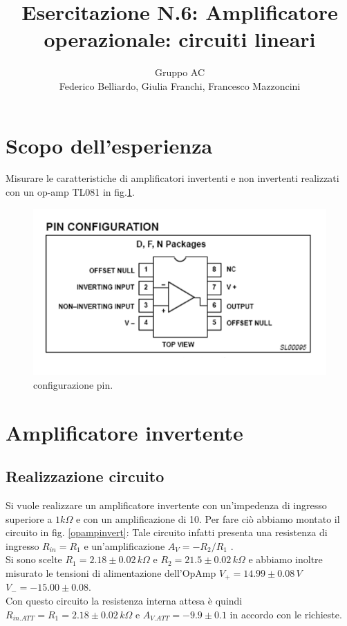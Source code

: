 \documentclass[10pt,a4paper]{article}
\author{Gruppo AC \\ Federico Belliardo, Giulia Franchi, Francesco Mazzoncini}
\title{Esercitazione N.6: Amplificatore operazionale: circuiti lineari}
\begin{document}
\maketitle
\section{Scopo dell'esperienza}

Misurare le caratteristiche di amplificatori invertenti e non invertenti realizzati con un op-amp TL081 in fig.\ref{pin}.
\begin{figure}[!htb]
  \centering
  \includegraphics[scale=0.5]{pinrelaz6.png}
\caption{configurazione pin.}
\label{pin}
\end{figure}

\section{Amplificatore invertente}
\subsection{Realizzazione circuito}
Si vuole realizzare un amplificatore invertente con un'impedenza di ingresso superiore a $1k\Omega$ e con un amplificazione di 10. 
Per fare ciò abbiamo montato il circuito in fig. \ref{opampinvert}: Tale circuito infatti presenta una  resistenza di ingresso $R_{in}=R_1$ e un'amplificazione  $A_V=-R_2/R_1$ .\\
Si sono scelte $R_1=2.18 \pm 0.02 \, k\Omega$ e $R_2=21.5 \pm0.02 \, k\Omega$ e abbiamo inoltre misurato le  tensioni di alimentazione dell'OpAmp $V_+=14.99 \pm 0.08 \, V$ $V_-=-15.00 \pm 0.08$.\\
Con questo circuito la resistenza interna attesa è quindi $R_{in.ATT}= R_1 = 2.18 \pm 0.02 \, k\Omega$ e $A_{V.ATT}= -9.9 \pm 0.1$ in accordo con le richieste.\\
\end{document}
